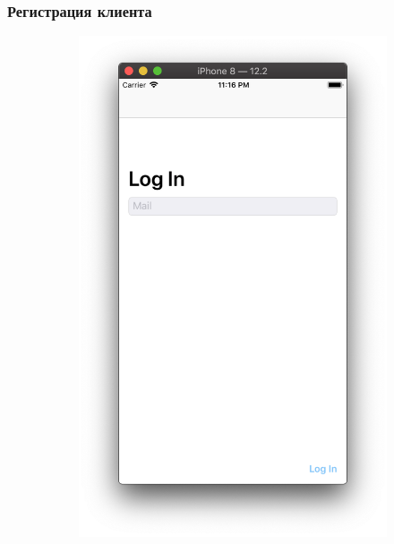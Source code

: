 \documentclass[a4paper,12pt]{article}
\begin{document}
	\subsubsection{Регистрация клиента}
	\begin{figure}[h!]
		\centering
		\begin{subfigure}[b]{0.3\linewidth}
			\includegraphics[width=\linewidth]{../includes/pmi/login.png}
		\end{subfigure}
		\begin{subfigure}[b]{0.3\linewidth}

\end{subfigure}
\end{figure}
\end{document}
